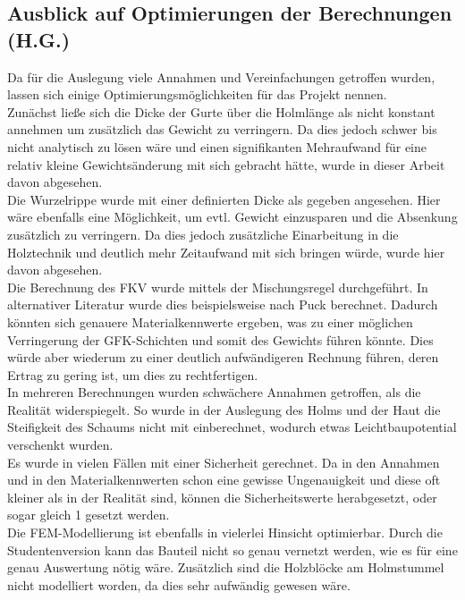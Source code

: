 \subsection{Ausblick auf Optimierungen der Berechnungen (H.G.)}
Da für die Auslegung viele Annahmen und Vereinfachungen getroffen wurden, lassen sich einige Optimierungsmöglichkeiten für das Projekt nennen.\\
\noindent
Zunächst ließe sich die Dicke der Gurte über die Holmlänge als nicht konstant annehmen um zusätzlich das Gewicht zu verringern. Da dies jedoch schwer bis nicht analytisch zu lösen wäre und einen signifikanten Mehraufwand für eine relativ kleine Gewichtsänderung mit sich gebracht hätte, wurde in dieser Arbeit davon abgesehen.\\
\noindent
Die Wurzelrippe wurde mit einer definierten Dicke als gegeben angesehen. Hier wäre ebenfalls eine Möglichkeit, um evtl. Gewicht einzusparen und die Absenkung zusätzlich zu verringern. Da dies jedoch zusätzliche Einarbeitung in die Holztechnik und deutlich mehr Zeitaufwand mit sich bringen würde, wurde hier davon abgesehen.\\
\noindent
Die Berechnung des FKV wurde mittels der Mischungsregel durchgeführt. In alternativer Literatur wurde dies beispielsweise nach Puck berechnet. Dadurch könnten sich genauere Materialkennwerte ergeben, was zu einer möglichen Verringerung der GFK-Schichten und somit des Gewichts führen könnte. Dies würde aber wiederum zu einer deutlich aufwändigeren Rechnung führen, deren Ertrag zu gering ist, um dies zu rechtfertigen.\\
\noindent
In mehreren Berechnungen wurden schwächere Annahmen getroffen, als die Realität widerspiegelt. So wurde in der Auslegung des Holms und der Haut die Steifigkeit des Schaums nicht mit einberechnet, wodurch etwas Leichtbaupotential verschenkt wurden.\\
\noindent
Es wurde in vielen Fällen mit einer Sicherheit gerechnet. Da in den Annahmen und in den Materialkennwerten schon eine gewisse Ungenauigkeit und diese oft kleiner als in der Realität sind, können die Sicherheitswerte herabgesetzt, oder sogar gleich 1 gesetzt werden.\\
\noindent
Die FEM-Modellierung ist ebenfalls in vielerlei Hinsicht optimierbar. Durch die Studentenversion kann das Bauteil nicht so genau vernetzt werden, wie es für eine genau Auswertung nötig wäre. Zusätzlich sind die Holzblöcke am Holmstummel nicht modelliert worden, da dies sehr aufwändig gewesen wäre.\\
\noindent